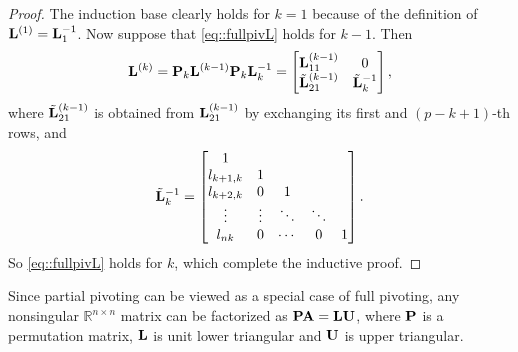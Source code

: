 \begin{proof}
    The induction base clearly holds for $k=1$ because of the 
    definition of ${\mathbf{L}}^{(1)}={\mathbf{L}}_1^{-1}$. Now suppose that 
    \eqref{eq::fullpivL} holds for $k-1$. Then
    $$
        {\mathbf{L}}^{(k)}={\mathbf{P}}_k{\mathbf{L}}^{(k-1)}{\mathbf{P}}_k{\mathbf{L}}_k^{-1}=
        \begin{bmatrix}
            {\mathbf{L}}_{11}^{(k-1)}&0\\
            \tilde{{\mathbf{L}}}_{21}^{(k-1)}&\tilde{{\mathbf{L}}}_k^{-1}
        \end{bmatrix},
    $$ 
    where $\tilde{{\mathbf{L}}}_{21}^{(k-1)}$ is obtained from 
    ${\mathbf{L}}_{21}^{(k-1)}$ by exchanging its first and $(p-k+1)$-th 
    rows, and
    $$
        \tilde{{\mathbf{L}}}_k^{-1}=
        \begin{bmatrix}
            1\\
            l_{k+1,k}&1\\
            l_{k+2,k}&0&1\\
            \vdots&\vdots&\ddots&\ddots\\
            l_{nk}&0&\cdots&0&1
        \end{bmatrix}.
    $$ 
    So \eqref{eq::fullpivL} holds for $k$, which complete the 
    inductive proof.
\end{proof}

\begin{prop}
    Since partial pivoting can be viewed as a special case of 
    full pivoting, any nonsingular $\mathbb{R}^{n\times n}$ 
    matrix can be factorized as ${\mathbf{P}}{\mathbf{A}}={\mathbf{L}}{\mathbf{U}}$, where ${\mathbf{P}}$ 
    is a permutation matrix, ${\mathbf{L}}$ is unit lower triangular and  ${\mathbf{U}}$ is upper triangular.
\end{prop}

